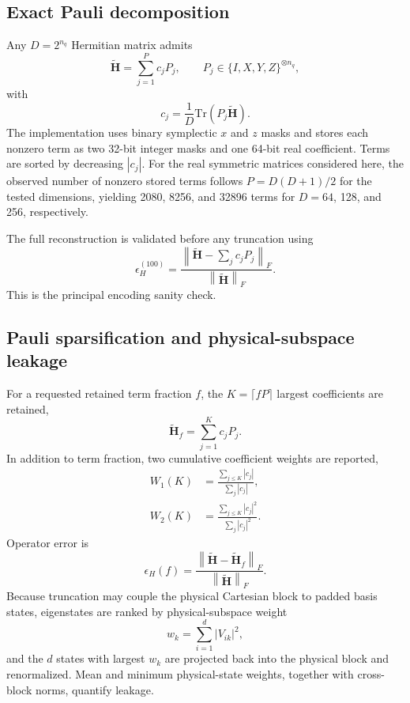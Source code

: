 \documentclass[aip,jcp,reprint,amsmath,amssymb,floatfix]{revtex4-2}
\newcommand{\Hp}{\widetilde{\mathbf{H}}}
\newcommand{\Hf}{\widetilde{\mathbf{H}}_{f}}
\newcommand{\Tr}{\mathrm{Tr}}
\newcommand{\norm}[1]{\left\lVert #1 \right\rVert}
\begin{document}
\subsection{Exact Pauli decomposition}
\cite{NielsenChuang2010}
Any $D=2^{n_q}$ Hermitian matrix admits
\begin{equation}
\Hp=\sum_{j=1}^{P} c_j P_j,
\qquad P_j\in\{I,X,Y,Z\}^{\otimes n_q},
\label{eq:paulidecomp}
\end{equation}
with
\begin{equation}
c_j=\frac{1}{D}\Tr(P_j\Hp).
\label{eq:paulicoeff}
\end{equation}
The implementation uses binary symplectic $x$ and $z$ masks and stores each nonzero term as two 32-bit integer masks and one 64-bit real coefficient. Terms are sorted by decreasing $|c_j|$. For the real symmetric matrices considered here, the observed number of nonzero stored terms follows $P=D(D+1)/2$ for the tested dimensions, yielding 2080, 8256, and 32896 terms for $D=64$, 128, and 256, respectively.

The full reconstruction is validated before any truncation using
\begin{equation}
\epsilon_H^{(100)}=
\frac{\norm{\Hp-\sum_jc_jP_j}_F}{\norm{\Hp}_F}.
\label{eq:fullpaulierr}
\end{equation}
This is the principal encoding sanity check.

\subsection{Pauli sparsification and physical-subspace leakage}
For a requested retained term fraction $f$, the $K=\lceil fP\rceil$ largest coefficients are retained,
\begin{equation}
\Hf=\sum_{j=1}^{K}c_jP_j.
\label{eq:compressedH}
\end{equation}
In addition to term fraction, two cumulative coefficient weights are reported,
\begin{align}
W_1(K)&=\frac{\sum_{j\le K}|c_j|}{\sum_j|c_j|},\\
W_2(K)&=\frac{\sum_{j\le K}|c_j|^2}{\sum_j|c_j|^2}.
\label{eq:weights}
\end{align}
Operator error is
\begin{equation}
\epsilon_H(f)=\frac{\norm{\Hp-\Hf}_F}{\norm{\Hp}_F}.
\label{eq:operror}
\end{equation}
Because truncation may couple the physical Cartesian block to padded basis states, eigenstates are ranked by physical-subspace weight
\begin{equation}
w_k=\sum_{i=1}^{d}|V_{ik}|^2,
\end{equation}
and the $d$ states with largest $w_k$ are projected back into the physical block and renormalized. Mean and minimum physical-state weights, together with cross-block norms, quantify leakage.
\end{document}
